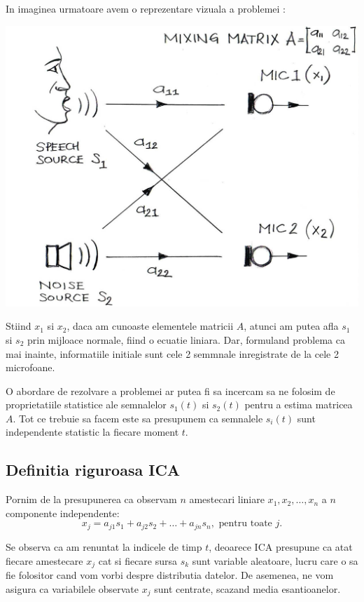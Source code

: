 \documentclass[12pt,oneside]{article}
\begin{document}
In imaginea urmatoare avem o reprezentare vizuala a problemei \cite{noise_reduction}:

\begin{center}
	\includegraphics[scale=0.4]{two-sound-sources}
\end{center}


Stiind $x_1$ si $x_2$, daca am cunoaste elementele matricii $A$, atunci am putea afla $s_1$ si $s_2$ prin mijloace normale, fiind o ecuatie liniara. Dar, formuland problema ca mai inainte, informatiile initiale sunt cele 2 semmnale inregistrate de la cele 2 microfoane.

O abordare de rezolvare a problemei ar putea fi sa incercam sa ne folosim de proprietatiile statistice ale semnalelor $s_1(t)$ si $s_2(t)$ pentru a estima matricea $A$. Tot ce trebuie sa facem este sa presupunem ca semnalele $s_i(t)$ sunt independente statistic la fiecare moment $t$.

\subsection{Definitia riguroasa ICA}
Pornim de la presupunerea ca observam $n$ amestecari liniare $x_1, x_2, \ldots, x_n$ a $n$ componente independente:
	\begin{equation}
		x_j=a_{j1}s_1+a_{j2}s_2+\ldots+a_{jn}s_n, \text{ pentru toate }j.
	\end{equation}

Se observa ca am renuntat la indicele de timp $t$, deoarece ICA presupune ca atat fiecare amestecare $x_j$ cat si fiecare sursa $s_k$ sunt variable aleatoare, lucru care o sa fie folositor cand vom vorbi despre distributia datelor. De asemenea, ne vom asigura ca variabilele observate $x_j$ sunt centrate, scazand media esantioanelor.
\end{document}
